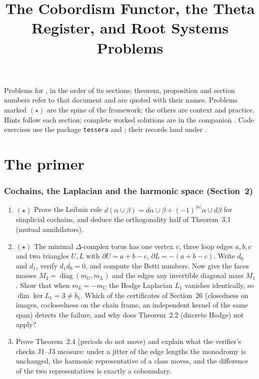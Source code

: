 \documentclass[11pt]{article}
\title{The Cobordism Functor, the Theta Register, and Root Systems\\[4pt]
\large Problems}
\author{}
\date{}
\begin{document}
\maketitle

Problems for , in the order
of its sections; theorem, proposition and section numbers refer to that
document and are quoted with their names. Problems marked $(\star)$ are the
spine of the framework; the others are context and practice. Hints follow
each section; complete worked solutions are in the companion
. Code exercises use the package
\texttt{tessera} and ; their
records land under .

\part*{The primer}

\section{Cochains, the Laplacian and the harmonic space (Section~2)}

\begin{enumerate}[label=\textbf{P\arabic*.},leftmargin=*,start=1]
\item $(\star)$ Prove the Leibniz rule $d(\alpha\cup\beta) = d\alpha\cup\beta
  + (-1)^{|\alpha|}\alpha\cup d\beta$ for simplicial cochains, and deduce the
  orthogonality half of Theorem~3.1 (mutual annihilators).
\item $(\star)$ The minimal $\Delta$-complex torus has one vertex $v$,
  three loop edges $a,b,c$ and two triangles $U,L$ with $\partial U = a+b-c$,
  $\partial L = -(a+b-c)$. Write $d_0$ and $d_1$, verify $d_1d_0 = 0$, and
  compute the Betti numbers. Now give the faces masses $M_2 = \operatorname{diag}(m_U,m_L)$
  and the edges any invertible diagonal mass $M_1$. Show that when $m_L = -m_U$
  the Hodge Laplacian $L_1$ vanishes identically, so $\dim\ker L_1 = 3\ne b_1$.
  Which of the certificates of Section~26 (closedness on images, coclosedness on
  the chain frame, an independent kernel of the same span) detects the failure,
  and why does Theorem~2.2 (discrete Hodge) not apply?
\item Prove Theorem~2.4 (periods do not move) and explain what the
  verifier's checks J1--J3 measure: under a jitter of the edge lengths the
  monodromy is unchanged, the harmonic representative of a class moves, and
  the difference of the two representatives is exactly a coboundary.
\end{enumerate}
\end{document}
